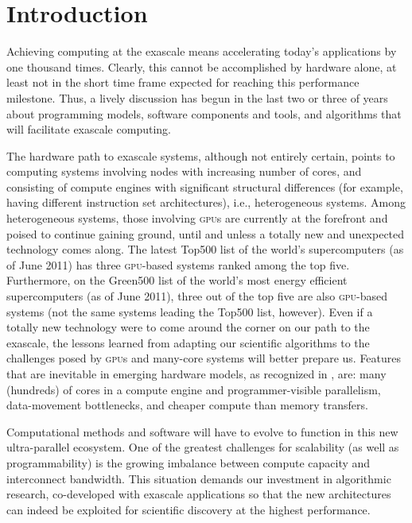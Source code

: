 \documentclass[10pt,twocolumn]{article}
\newcommand{\gpu}{\textsc{gpu}}
\newlength{\up}
\begin{document}
\section{Introduction}

Achieving  computing at the exascale means accelerating today's applications by one thousand times. Clearly, this cannot be accomplished by hardware alone, at least not in the short time frame expected for reaching this performance milestone. Thus, a lively discussion has begun in the last two or three of years about programming models, software components and tools, and algorithms that will facilitate exascale computing. 

The hardware path to exascale systems, although not entirely certain, points to computing systems involving nodes with increasing number of cores, and consisting of compute engines with significant structural differences (for example, having different instruction set architectures), i.e.,  heterogeneous systems.
Among heterogeneous systems, those involving \gpu s are currently at the forefront and poised to continue gaining ground, until and unless a totally new and unexpected technology comes along. The latest Top500 list of the world's supercomputers (as of June 2011) has three \gpu-based systems ranked among the top five. Furthermore, on the Green500 list \cite[]{Green500} of the world's most energy efficient supercomputers (as of June 2011),  three out of the top five are also \gpu-based systems (not the same systems leading the Top500 list, however).
Even if a totally new technology were to come around the corner on our path to the exascale, the lessons learned from adapting our scientific algorithms to the challenges posed by \gpu s and many-core systems will better prepare us.  Features that are inevitable in emerging hardware models, as recognized in \cite{DarpaExascale2008}, are:  many (hundreds) of cores in a compute engine and programmer-visible parallelism, data-movement bottlenecks, and cheaper compute than memory transfers.  

Computational methods and software will have to evolve to function in this new ultra-parallel ecosystem. One of the greatest challenges for scalability (as well as programmability) is the growing imbalance between compute capacity and interconnect bandwidth.  This situation demands our investment in algorithmic research, co-developed with exascale applications so that the new architectures can indeed be exploited for scientific discovery at the highest performance.
\end{document}
